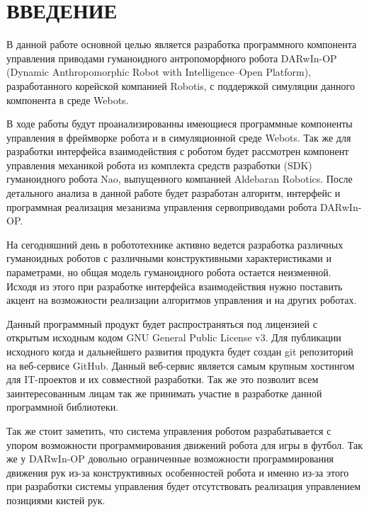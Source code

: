 \chapter*{ВВЕДЕНИЕ}

В данной работе основной целью является разработка программного компонента управления приводами гуманоидного антропоморфного робота DARwIn-OP (Dynamic Anthropomorphic Robot with Intelligence–Open Platform), разработанного корейской компанией  Robotis, с поддержкой симуляции данного компонента в среде Webots.

В ходе работы будут проанализированны имеющиеся программные компоненты управления в фреймворке робота и в симуляционной среде Webots. Так же для разработки интерфейса взаимодействия с роботом будет рассмотрен компонент управления механикой робота из комплекта средств разработки (SDK) гуманоидного робота Nao, выпущенного компанией Aldebaran Robotics. После детального анализа в данной работе будет разработан алгоритм, интерфейс и программная реализация мезанизма управления сервоприводами робота DARwIn-OP.

На сегодняшний день в робототехнике активно ведется разработка различных гуманоидных роботов с различными конструктивными характеристиками и параметрами, но общая модель гуманоидного робота остается неизменной. Исходя из этого при разработке интерфейса взаимодействия нужно поставить акцент на возможности реализации алгоритмов управления и на других роботах.

Данный программный продукт будет распространяться под лицензией с открытым исходным кодом GNU General Public License v3. Для публикации исходного когда и дальнейшего развития продукта будет создан git репозиторий на веб-сервисе GitHub. Данный веб-сервис является самым крупным хостингом для IT-проектов и их совместной разработки. Так же это позволит всем заинтересованным лицам так же принимать участие в разработке данной программной библиотеки.

Так же стоит заметить, что система управления роботом разрабатывается с упором возможности программирования движений робота для игры в футбол. Так же у DARwIn-OP довольно ограниченные возможности программирования движения рук из-за конструктивных особенностей робота и именно из-за этого при разработки системы управления будет отсутствовать реализация управлением позициями кистей рук.